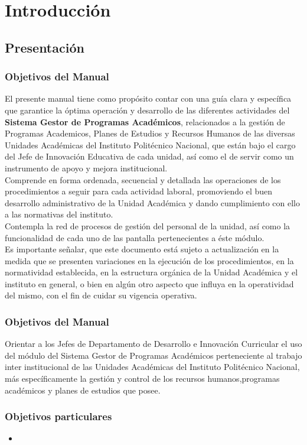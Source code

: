 \chapter{Introducción}
\section{Presentación}
\subsection{Objetivos del Manual}
El presente manual tiene como propósito contar con una guía clara y específica que garantice la óptima operación y desarrollo de las diferentes actividades del \textbf{Sistema Gestor de Programas Académicos}, relacionados a la gestión de Programas Academicos, Planes de Estudios y Recursos Humanos de las diversas Unidades Académicas del Instituto Politécnico Nacional, que están bajo el cargo del Jefe de Innovación Educativa de cada unidad, así como el de servir como un instrumento de apoyo y mejora institucional.\\

Comprende en forma ordenada, secuencial y detallada las operaciones de los procedimientos a seguir para cada actividad laboral, promoviendo el buen desarrollo administrativo de la Unidad Académica y dando cumplimiento con ello a las normativas del instituto.\\

Contempla la red de procesos de gestión del personal de la unidad, así como la funcionalidad de cada uno de las pantalla pertenecientes a éste módulo.\\

Es importante señalar, que este documento está sujeto a actualización en la medida que se presenten variaciones en la ejecución de los procedimientos, en la normatividad establecida, en la estructura orgánica de la Unidad Académica y el instituto en general, o bien en algún otro aspecto que influya en la operatividad del mismo, con el fin de cuidar su vigencia operativa.\\

    \subsection{Objetivos del Manual}
     Orientar a los Jefes de Departamento de Desarrollo e Innovación Curricular el uso del módulo del Sistema Gestor de Programas Académicos perteneciente al trabajo inter institucional de las Unidades Académicas del Instituto Politécnico Nacional, más específicamente la gestión y control de los recursos humanos,programas académicos y planes de estudios que posee.
    
    \subsection{Objetivos particulares}
    \begin{itemize}
      \item %
    \end{itemize}
